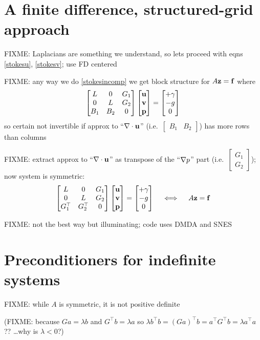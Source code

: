 \section{A finite difference, structured-grid approach}

FIXME: Laplacians are something we understand, so lets proceed with eqns \eqref{stokesu}, \eqref{stokesv}; use FD centered

FIXME: any way we do \eqref{stokesincomp} we get block structure for $A \mathbf{z} = \mathbf{f}$ where
    $$\begin{bmatrix}
    L & 0 & G_1 \\
    0 & L & G_2 \\
    B_1 & B_2 & 0
    \end{bmatrix}
    \begin{bmatrix}
    \mathbf{u} \\ \mathbf{v} \\ \mathbf{p}
    \end{bmatrix}
    =
    \begin{bmatrix}
    + \gamma \\ - g \\ 0
    \end{bmatrix}
    $$
so certain not invertible if approx to ``$\nabla\cdot \mathbf{u}$'' (i.e.~$\begin{bmatrix} B_1 & B_2 \end{bmatrix}$) has more rows than columns

FIXME: extract approx to ``$\nabla\cdot \mathbf{u}$'' as transpose of the ``$\nabla p$'' part (i.e.~$\begin{bmatrix} G_1 \\ G_2 \end{bmatrix}$); now system is symmetric:
    $$\begin{bmatrix}
    L & 0 & G_1 \\
    0 & L & G_2 \\
    G_1^\top & G_2^\top & 0
    \end{bmatrix}
    \begin{bmatrix}
    \mathbf{u} \\ \mathbf{v} \\ \mathbf{p}
    \end{bmatrix}
    =
    \begin{bmatrix}
    + \gamma \\ - g \\ 0
    \end{bmatrix}
    \quad \iff \quad A\mathbf{z} = \mathbf{f}
    $$

FIXME: not the best way but illuminating; code uses DMDA and SNES

\section{Preconditioners for indefinite systems}

FIXME: while $A$ is symmetric, it is not positive definite

(FIXME: because $G a = \lambda b$ and
$G^\top b = \lambda a$ so
$\lambda b^\top b = (G a)^\top b = a^\top G^\top b = \lambda a^\top a$ ?? \dots why is $\lambda < 0$?)


